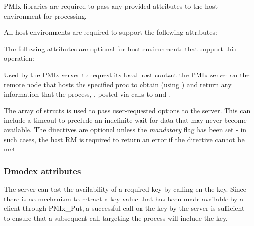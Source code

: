 \reqattrstart
\ac{PMIx} libraries are required to pass any provided attributes to the host environment for processing.

All host environments are required to support the following attributes:


\reqattrend

\optattrstart
The following attributes are optional for host environments that support this operation:


\optattrend

\descr

Used by the \ac{PMIx} server to request its local host contact the \ac{PMIx} server on the remote node that hosts the specified proc to obtain (using ) and return any information that the process, , posted via calls to  and .

The array of  structs is used to pass user-requested options to the server.
This can include a timeout to preclude an indefinite wait for data that may never become available.
The directives are optional unless the \emph{mandatory} flag has been set - in such cases, the host \ac{RM} is required to return an error if the directive cannot be met.


\subsubsection{Dmodex attributes}

%

\vspace{\baselineskip}
\advicermstart
The server can test the availability of a required key by calling  on the key.  Since there is no mechanism to retract a key-value that has been made available by a client through PMIx_Put, a successful  call on the key by the server is sufficient to ensure that a subsequent  call targeting the process will include the key.
\advicermend

